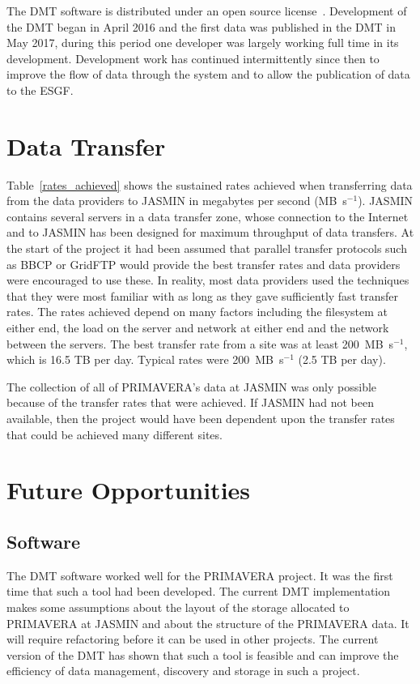 \documentclass[gmd, manuscript]{copernicus}
\begin{document}
The DMT software is distributed under an open source license~\citep{Seddon2019}. Development of the DMT began in April 2016 and the first data was published in the DMT in May 2017, during this period one developer was largely working full time in its development. Development work has continued intermittently since then to improve the flow of data through the system and to allow the publication of data to the ESGF. 

\section{Data Transfer}
\label{transfer_rates}

Table~\ref{rates_achieved} shows the sustained rates achieved when transferring data from the data providers to JASMIN in megabytes per second (MB~s$^{-1}$). JASMIN contains several servers in a data transfer zone, whose connection to the Internet and to JASMIN has been designed for maximum throughput of data transfers. At the start of the project it had been assumed that parallel transfer protocols such as BBCP or GridFTP would provide the best transfer rates and data providers were encouraged to use these. In reality, most data providers used the techniques that they were most familiar with as long as they gave sufficiently fast transfer rates. The rates achieved depend on many factors including the filesystem at either end, the load on the server and network at either end and the network between the servers. The best transfer rate from a site was at least 200~MB~s$^{-1}$, which is 16.5 TB per day. Typical rates were 200~MB~s$^{-1}$ (2.5 TB per day).

The collection of all of PRIMAVERA's data at JASMIN was only possible because of the transfer rates that were achieved. If JASMIN had not been available, then the project would have been dependent upon the transfer rates that could be achieved many different sites.


\section{Future Opportunities}

\subsection{Software}

The DMT software worked well for the PRIMAVERA project. It was the first time that such a tool had been developed. The current DMT implementation makes some assumptions about the layout of the storage allocated to PRIMAVERA at JASMIN and about the structure of the PRIMAVERA data. It will require refactoring before it can be used in other projects. The current version of the DMT has shown that such a tool is feasible and can improve the efficiency of data management, discovery and storage in such a project.
\end{document}
